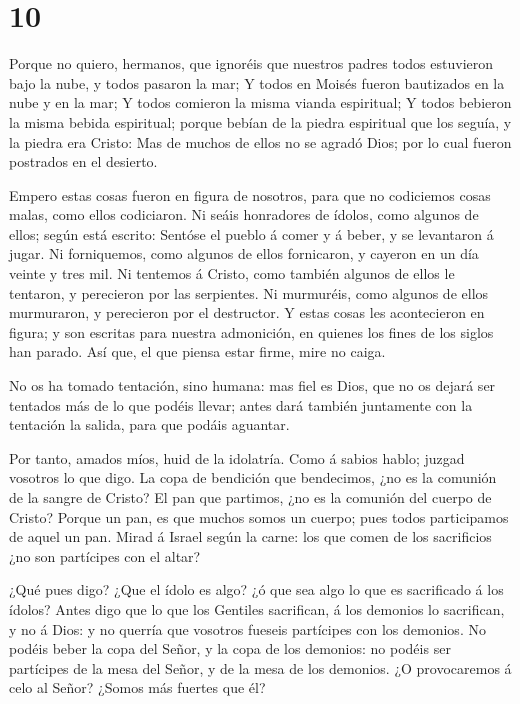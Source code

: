 \hypertarget{section-9}{%
\section{10}\label{section-9}}

 Porque no quiero, hermanos, que ignoréis que nuestros
padres todos estuvieron bajo la nube, y todos pasaron la mar;
 Y todos en Moisés fueron bautizados en la nube y en la mar;
 Y todos comieron la misma vianda espiritual;  Y
todos bebieron la misma bebida espiritual; porque bebían de la piedra
espiritual que los seguía, y la piedra era Cristo:  Mas de
muchos de ellos no se agradó Dios; por lo cual fueron postrados en el
desierto.

 Empero estas cosas fueron en figura de nosotros, para que
no codiciemos cosas malas, como ellos codiciaron.  Ni seáis
honradores de ídolos, como algunos de ellos; según está escrito: Sentóse
el pueblo á comer y á beber, y se levantaron á jugar.  Ni
forniquemos, como algunos de ellos fornicaron, y cayeron en un día
veinte y tres mil.  Ni tentemos á Cristo, como también
algunos de ellos le tentaron, y perecieron por las serpientes.
 Ni murmuréis, como algunos de ellos murmuraron, y
perecieron por el destructor.  Y estas cosas les
acontecieron en figura; y son escritas para nuestra admonición, en
quienes los fines de los siglos han parado.  Así que, el
que piensa estar firme, mire no caiga.

 No os ha tomado tentación, sino humana: mas fiel es Dios,
que no os dejará ser tentados más de lo que podéis llevar; antes dará
también juntamente con la tentación la salida, para que podáis aguantar.

 Por tanto, amados míos, huid de la idolatría.
 Como á sabios hablo; juzgad vosotros lo que digo.
 La copa de bendición que bendecimos, ¿no es la comunión de
la sangre de Cristo? El pan que partimos, ¿no es la comunión del cuerpo
de Cristo?  Porque un pan, es que muchos somos un cuerpo;
pues todos participamos de aquel un pan.  Mirad á Israel
según la carne: los que comen de los sacrificios ¿no son partícipes con
el altar?

 ¿Qué pues digo? ¿Que el ídolo es algo? ¿ó que sea algo lo
que es sacrificado á los ídolos?  Antes digo que lo que los
Gentiles sacrifican, á los demonios lo sacrifican, y no á Dios: y no
querría que vosotros fueseis partícipes con los demonios. 
No podéis beber la copa del Señor, y la copa de los demonios: no podéis
ser partícipes de la mesa del Señor, y de la mesa de los demonios.
 ¿O provocaremos á celo al Señor? ¿Somos más fuertes que
él?

